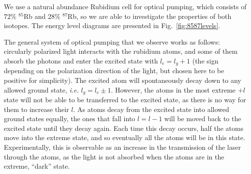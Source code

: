 We use a natural abundance Rubidium cell for optical pumping, which
consists of $72\%$ $^{85}$Rb and $28\%$ $^{87}$Rb, so we are able to
investigate the properties of both isotopes. The energy level diagrams
are presented in Fig.~\ref{fig:8587levels}.


The general system of optical pumping that we observe works as follows: circularly polarized light interacts with the rubidium atoms, and some of them absorb the photons and enter the excited state with $l_{e}=l_{g}+1$ (the sign depending on the polarization direction of the light, but chosen here to be positive for simplicity). The excited atom will spontaneously decay down to any allowed ground state, \emph{i.e.} $l_{g} = l_{e} \pm 1$. However, the atoms in the most extreme $+l$ state will not be able to be transferred to the excited state, as there is no way for them to increase their $l$. As atoms decay from the excited state into allowed ground states equally, the ones that fall into $l=l-1$ will be moved back to the excited state until they decay again. Each time this decay occurs, half the atoms move into the extreme state, and so eventually all the atoms will be in this state. Experimentally, this is observable as an increase in the transmission of the laser through the atoms, as the light is not absorbed when the atoms are in the extreme, ``dark'' state. 

